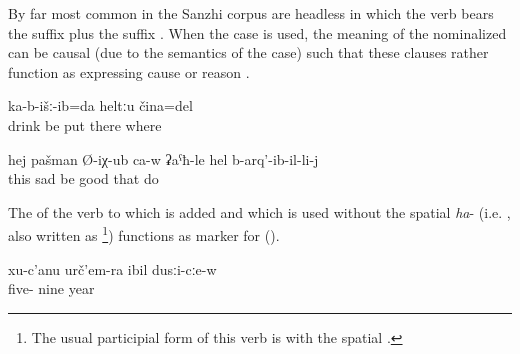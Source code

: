 By far most common in the Sanzhi corpus are headless  in which the verb bears the  suffix plus the suffix  . When the  case is used, the meaning of the nominalized  can be causal (due to the semantics of the  case) such that these clauses rather function as  expressing cause or reason .
%
\begin{exe}
	\ex	\label{ex:‎the one where they are sitting and drinking, I put this (picture) somewhere}
	\gll	[b-učː-ul	ka-b-iž-ib-il]	ka-b-išː-ib=da	heltːu	čina=del\\
		drink	be	put	there	where\\
	\glt	{}
\end{exe}
%
\begin{exe}	
	\ex	\label{ex:He became sad, in my opinion, he got very sad, because of what he did minor}
	\gll	hej	pašman	Ø-iχ-ub	ca-w	ʡaˁħ-le	hel	b-arq'-ib-il-li-j	\\
		this	sad	be		good	that	do\\
	\glt	{}

\end{exe}

The  of the verb  to which  is added and which is used without the spatial  \textit{ha}- (i.e. , also written as \footnote{The usual participial form of this verb is  with the spatial .}) functions as marker for   ().
%
\begin{exe}
	\ex	\label{ex:in the year (19)59}
	\gll	xu-c'anu	urč'em-ra	ibil	dusːi-cːe-w\\
		five-	nine		year\\
	\glt	{}
\end{exe}

